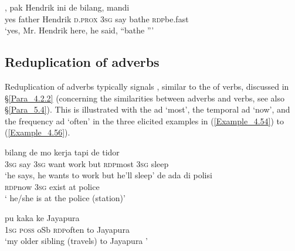 \ea
\label{Example_4.53}
, {pak} {Hendrik} {ini} {de} {bilang}, {mandi} {}\\ %
 yes  father  Hendrik  \textsc{d.prox}  \textsc{3sg}  say  bathe  \textsc{rdp}{\Tilde}be.fast\\
\glt
‘yes, Mr. Hendrik here, he said, ``bathe ''' \textstyleExampleSource{[080917-008-NP.0133]}
\z


\subsection{Reduplication of adverbs}\label{Para_4.2.3}

Reduplication of adverbs typically signals , similar to the  of verbs, discussed in §\ref{Para_4.2.2} (concerning the similarities between adverbs and verbs, see also §\ref{Para_5.4}). This is illustrated with the  ad  ‘most’, the temporal ad  ‘now’, and the frequency ad  ‘often’ in the three elicited examples in (\ref{Example_4.54}) to (\ref{Example_4.56}).



\ea
\label{Example_4.54}
 {bilang} {de} {mo} {kerja} {tapi} {} {de} {tidor}\\ %
 \textsc{3sg}  say  \textsc{3sg}  want  work  but  \textsc{rdp}{\Tilde}most  \textsc{3sg}  sleep\\
\glt 
‘he says, he wants to work but  he’ll sleep’ \textstyleExampleSource{[Elicited BR120813.015]}
\z
\ea
\label{Example_4.55}
    de  ada  di  polisi\\
 \textsc{rdp}{\Tilde}now  \textsc{3sg}  exist  at  police\\
\glt 
‘ he/she is at the police (station)’ \textstyleExampleSource{[Elicited BR131231.002]}
\z

\ea
\label{Example_4.56}
 {pu} {kaka} {} {ke} {Jayapura}\\ %
 \textsc{1sg}  \textsc{poss}  oSb  \textsc{rdp}{\Tilde}often  to  Jayapura\\
\glt
‘my older sibling (travels) to Jayapura ’ \textstyleExampleSource{[Elicited BR131231.001]}
\z


